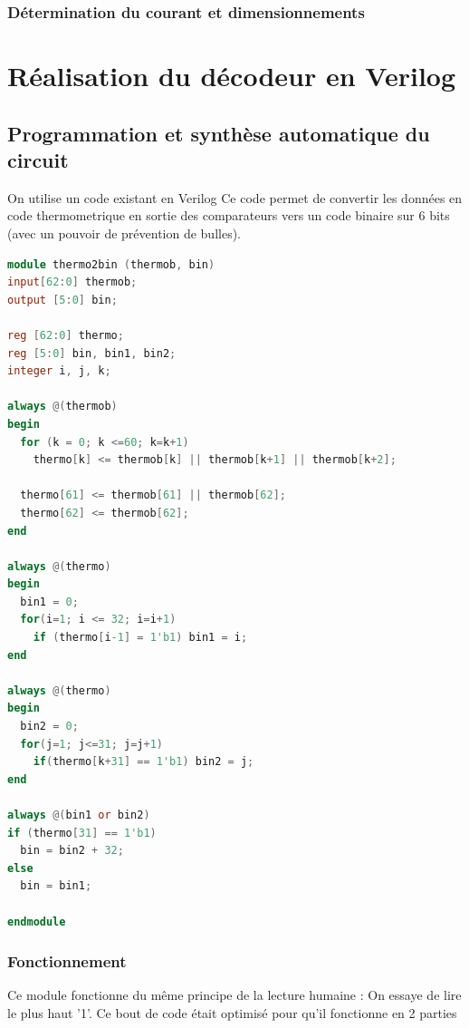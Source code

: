 \documentclass[11pt]{article}
\begin{document}
\subsubsection{D\'etermination du courant et dimensionnements}
\fi

\clearpage

\section{R\'ealisation du d\'ecodeur en Verilog}
\subsection{Programmation et synth\`ese automatique du circuit}
On utilise un code existant en Verilog\cite{Thermometer}
Ce code permet de convertir les donn\'ees en code thermometrique en sortie des
comparateurs vers un code binaire sur 6 bits (avec un pouvoir de pr\'evention de bulles).

\begin{lstlisting}[language=Verilog, belowskip=-0.5 \baselineskip]
module thermo2bin (thermob, bin)
input[62:0] thermob;
output [5:0] bin;

reg [62:0] thermo;
reg [5:0] bin, bin1, bin2;
integer i, j, k;

always @(thermob)
begin
  for (k = 0; k <=60; k=k+1)
    thermo[k] <= thermob[k] || thermob[k+1] || thermob[k+2];

  thermo[61] <= thermob[61] || thermob[62];
  thermo[62] <= thermob[62];
end

always @(thermo)
begin
  bin1 = 0;
  for(i=1; i <= 32; i=i+1)
    if (thermo[i-1] = 1'b1) bin1 = i;
end

always @(thermo)
begin
  bin2 = 0;
  for(j=1; j<=31; j=j+1)
    if(thermo[k+31] == 1'b1) bin2 = j;
end

always @(bin1 or bin2)
if (thermo[31] == 1'b1)
  bin = bin2 + 32;
else
  bin = bin1;

endmodule

\end{lstlisting}

\subsubsection{Fonctionnement}

Ce module fonctionne du m\^eme principe de la lecture humaine : On essaye de lire le plus
haut '1'. Ce bout de code \'etait optimis\'e pour qu'il fonctionne en 2 parties
\end{document}
